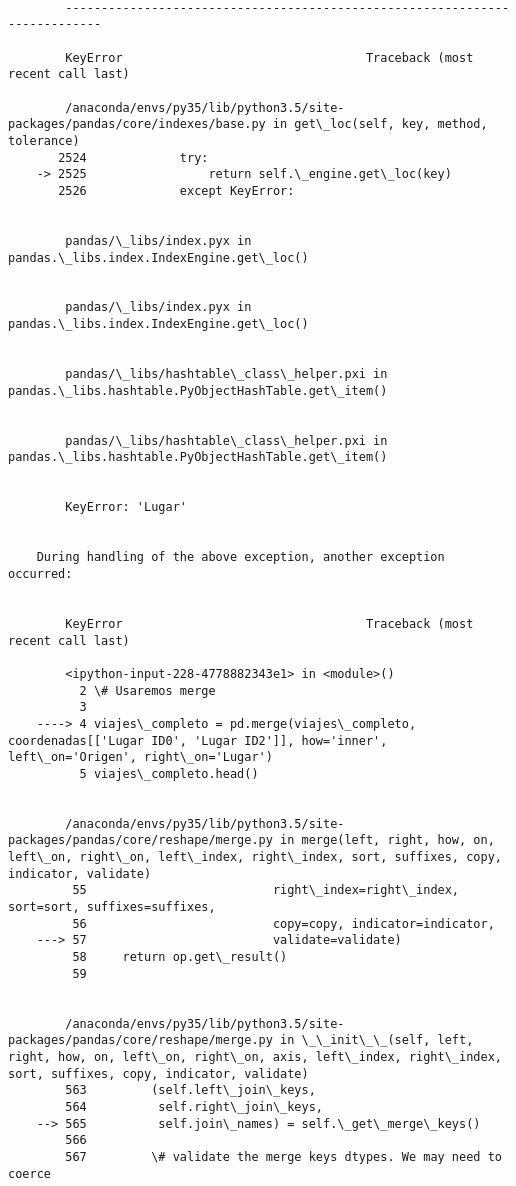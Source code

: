 \documentclass[11pt]{article}
\begin{document}
    \begin{Verbatim}[commandchars=\\\{\}]

        ---------------------------------------------------------------------------

        KeyError                                  Traceback (most recent call last)

        /anaconda/envs/py35/lib/python3.5/site-packages/pandas/core/indexes/base.py in get\_loc(self, key, method, tolerance)
       2524             try:
    -> 2525                 return self.\_engine.get\_loc(key)
       2526             except KeyError:


        pandas/\_libs/index.pyx in pandas.\_libs.index.IndexEngine.get\_loc()


        pandas/\_libs/index.pyx in pandas.\_libs.index.IndexEngine.get\_loc()


        pandas/\_libs/hashtable\_class\_helper.pxi in pandas.\_libs.hashtable.PyObjectHashTable.get\_item()


        pandas/\_libs/hashtable\_class\_helper.pxi in pandas.\_libs.hashtable.PyObjectHashTable.get\_item()


        KeyError: 'Lugar'

        
    During handling of the above exception, another exception occurred:


        KeyError                                  Traceback (most recent call last)

        <ipython-input-228-4778882343e1> in <module>()
          2 \# Usaremos merge
          3 
    ----> 4 viajes\_completo = pd.merge(viajes\_completo, coordenadas[['Lugar ID0', 'Lugar ID2']], how='inner', left\_on='Origen', right\_on='Lugar')
          5 viajes\_completo.head()


        /anaconda/envs/py35/lib/python3.5/site-packages/pandas/core/reshape/merge.py in merge(left, right, how, on, left\_on, right\_on, left\_index, right\_index, sort, suffixes, copy, indicator, validate)
         55                          right\_index=right\_index, sort=sort, suffixes=suffixes,
         56                          copy=copy, indicator=indicator,
    ---> 57                          validate=validate)
         58     return op.get\_result()
         59 


        /anaconda/envs/py35/lib/python3.5/site-packages/pandas/core/reshape/merge.py in \_\_init\_\_(self, left, right, how, on, left\_on, right\_on, axis, left\_index, right\_index, sort, suffixes, copy, indicator, validate)
        563         (self.left\_join\_keys,
        564          self.right\_join\_keys,
    --> 565          self.join\_names) = self.\_get\_merge\_keys()
        566 
        567         \# validate the merge keys dtypes. We may need to coerce



\end{Verbatim}
\end{document}
